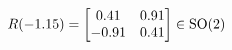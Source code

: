 \documentclass[preview]{standalone}
\begin{document}
\begin{align*}
\special{dvisvgm:raw <g id='unique000'>}R(-1.15) = \begin{bmatrix} 0.41 & 0.91 \\ -0.91 & 0.41 \end{bmatrix} \in \text{SO}(2)\special{dvisvgm:raw </g>}
\end{align*}
\end{document}
